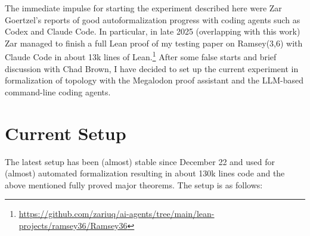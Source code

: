 \documentclass[a4paper,UKenglish,cleveref, autoref, thm-restate]{lipics-v2021}
\begin{document}
The immediate impulse for starting the experiment described here were
Zar Goertzel's reports of good autoformalization progress with
coding agents such as Codex and Claude Code. In particular, in late
2025 (overlapping with this work) Zar managed to finish a full Lean proof of my testing paper on
Ramsey(3,6) with Claude Code in about 13k lines of Lean.\footnote{\url{https://github.com/zariuq/ai-agents/tree/main/lean-projects/ramsey36/Ramsey36}} After some
false starts and brief discussion with Chad Brown, I have decided to set up the current experiment in
formalization of topology with the Megalodon proof assistant and the
LLM-based command-line coding agents.

\section{Current Setup}

The latest setup has been (almost) stable since December 22 and used
for (almost) automated formalization resulting in about 130k lines
code and the above mentioned fully proved major theorems. The setup is as follows:
\end{document}
